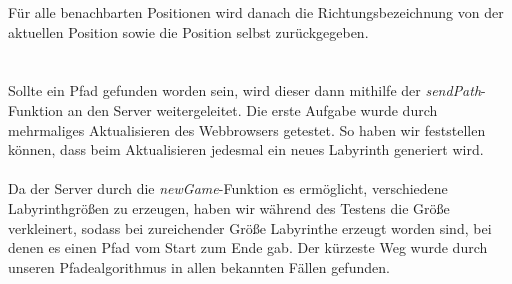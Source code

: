 \documentclass{rp}
\begin{document}
Für alle benachbarten Positionen wird danach die Richtungsbezeichnung von der aktuellen Position sowie die Position selbst zurückgegeben.\\\\\\
Sollte ein Pfad gefunden worden sein, wird dieser dann mithilfe der \textit{sendPath}-Funktion an den Server weitergeleitet.
Die erste Aufgabe wurde durch mehrmaliges Aktualisieren des Webbrowsers getestet. So haben wir feststellen können, dass beim Aktualisieren jedesmal ein neues Labyrinth generiert wird.\\\\
Da der Server durch die \textit{newGame}-Funktion es ermöglicht, verschiedene Labyrinthgrößen zu erzeugen, haben wir während des Testens die Größe verkleinert, sodass bei zureichender Größe Labyrinthe erzeugt worden sind, bei denen es einen Pfad vom Start zum Ende gab. Der kürzeste Weg wurde durch unseren Pfadealgorithmus in allen bekannten Fällen gefunden.
\end{document}
